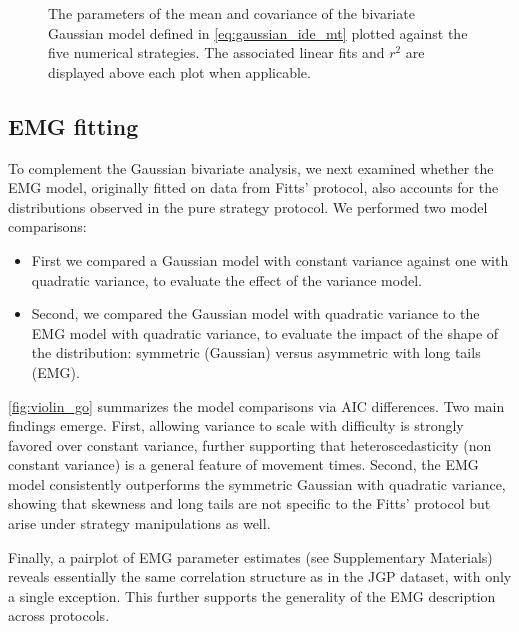 \documentclass[acmlarge, manuscript,review]{acmart}
\begin{document}
\begin{figure}[htbp]
	\centering
	\caption{The parameters of the mean and covariance of the bivariate Gaussian model defined in \autoref{eq:gaussian_ide_mt} plotted against the five numerical strategies. The associated linear fits and $r^2$ are displayed above each plot when applicable.}
	\label{fig:meancov_strat}

\end{figure}


\subsection{EMG fitting \label{sub:go:emg}}
To complement the Gaussian bivariate analysis, we next examined whether the EMG model, originally fitted on data from Fitts' protocol, also accounts for the distributions observed in the pure strategy protocol.
We performed two model comparisons: 
\begin{itemize}
	\item First we compared a Gaussian model with constant variance against one with quadratic variance, to evaluate the effect of the variance model.
	\item Second, we compared the Gaussian model with quadratic variance to the EMG model with quadratic variance, to evaluate the impact of the shape of the distribution: symmetric (Gaussian) versus asymmetric with long tails (EMG).
\end{itemize}

\autoref{fig:violin_go} summarizes the model comparisons via AIC differences. Two main findings emerge. First, allowing variance to scale with difficulty is strongly favored over constant variance, further supporting that heteroscedasticity (non constant variance) is a general feature of movement times. Second, the EMG model consistently outperforms the symmetric Gaussian with quadratic variance, showing that skewness and long tails are not specific to the Fitts' protocol but arise under strategy manipulations as well.

Finally, a pairplot of EMG parameter estimates (see Supplementary Materials) reveals essentially the same correlation structure as in the JGP dataset, with only a single exception. This further supports the generality of the EMG description across protocols.
\end{document}
